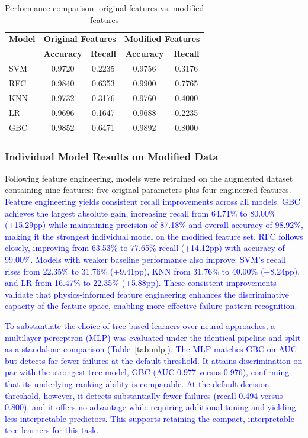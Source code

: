 \documentclass[final,5p, twocolumn]{elsarticle}
\begin{document}
\begin{table}[htbp]
\centering
\caption{Performance comparison: original features vs. modified features}
\label{tab:feature_comparison}
\small
\begin{tabular}{lcccc}
\hline
\textbf{Model} & \multicolumn{2}{c}{\textbf{Original Features}} & \multicolumn{2}{c}{\textbf{Modified Features}} \\
 & \textbf{Accuracy} & \textbf{Recall} & \textbf{Accuracy} & \textbf{Recall} \\
\hline
SVM & 0.9720 & 0.2235 & 0.9756 & 0.3176 \\
RFC & 0.9840 & 0.6353 & 0.9900 & 0.7765 \\
KNN & 0.9732 & 0.3176 & 0.9760 & 0.4000 \\
LR & 0.9696 & 0.1647 & 0.9688 & 0.2235 \\
GBC & 0.9852 & 0.6471 & 0.9892 & 0.8000 \\
\hline
\end{tabular}
\end{table}

\subsubsection{Individual Model Results on Modified Data}
\label{sec:results_modified_individual}

Following feature engineering, models were retrained on the augmented dataset containing nine features: five original parameters plus four engineered features. \textcolor{blue}{Feature engineering yields consistent recall improvements across all models. GBC achieves the largest absolute gain, increasing recall from 64.71\% to 80.00\% (+15.29pp) while maintaining precision of 87.18\% and overall accuracy of 98.92\%, making it the strongest individual model on the modified feature set. RFC follows closely, improving from 63.53\% to 77.65\% recall (+14.12pp) with accuracy of 99.00\%. Models with weaker baseline performance also improve: SVM's recall rises from 22.35\% to 31.76\% (+9.41pp), KNN from 31.76\% to 40.00\% (+8.24pp), and LR from 16.47\% to 22.35\% (+5.88pp). These consistent improvements validate that physics-informed feature engineering enhances the discriminative capacity of the feature space, enabling more effective failure pattern recognition.}

\textcolor{blue}{To substantiate the choice of tree-based learners over neural approaches, a multilayer perceptron (MLP) was evaluated under the identical pipeline and split as a standalone comparison (Table~\ref{tab:mlp}). The MLP matches GBC on AUC but detects far fewer failures at the default threshold. It attains discrimination on par with the strongest tree model, GBC (AUC 0.977 versus 0.976), confirming that its underlying ranking ability is comparable. At the default decision threshold, however, it detects substantially fewer failures (recall 0.494 versus 0.800), and it offers no advantage while requiring additional tuning and yielding less interpretable predictors. This supports retaining the compact, interpretable tree learners for this task.}
\end{document}
